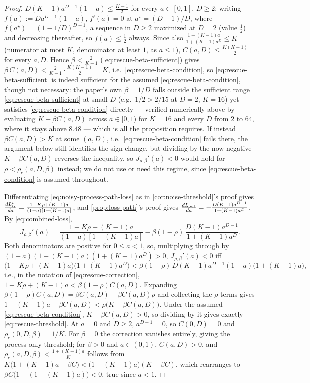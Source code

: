 \begin{proof}
$D(K-1)a^{D-1}(1-a)\le\frac{K-1}2$ for every $a\in[0,1]$, $D\ge2$: writing
$f(a):=Da^{D-1}(1-a)$, $f'(a)=0$ at $a^\star=(D-1)/D$, where
$f(a^\star)=(1-1/D)^{D-1}$, a sequence in $D\ge2$ maximized at $D=2$
(value $\tfrac12$) and decreasing thereafter, so $f(a)\le\tfrac12$
always. Since also $\frac{1+(K-1)a}{1+(K-1)a^D}\le K$ (numerator at most
$K$, denominator at least $1$, as $a\le1$), $C(a,D)\le\frac{K(K-1)}2$ for
every $a,D$. Hence $\beta<\frac2{K-1}$ (\cref{eq:rescue-beta-sufficient})
gives $\beta\,C(a,D)<\frac2{K-1}\cdot\frac{K(K-1)}2=K$, i.e.\
\cref{eq:rescue-beta-condition}, so \cref{eq:rescue-beta-sufficient} is
indeed sufficient for the assumed \cref{eq:rescue-beta-condition}, though
not necessary: the paper's own $\beta=1/D$ falls outside the sufficient
range \cref{eq:rescue-beta-sufficient} at small $D$ (e.g.\ $1/2>2/15$ at
$D=2$, $K=16$) yet satisfies \cref{eq:rescue-beta-condition} directly ---
verified numerically above by evaluating $K-\beta C(a,D)$ across
$a\in[0,1)$ for $K=16$ and every $D$ from $2$ to $64$, where it stays
above $8.48$ --- which is all the proposition requires. If instead
$\beta C(a,D)>K$ at some $(a,D)$, i.e.\ \cref{eq:rescue-beta-condition}
fails there, the argument below still identifies the sign change, but
dividing by the now-negative $K-\beta C(a,D)$ reverses the inequality, so
$J_{\rho,\beta}'(a)<0$ would hold for $\rho<\rho_c(a,D,\beta)$ instead; we
do not use or need this regime, since \cref{eq:rescue-beta-condition} is
assumed throughout.

Differentiating \cref{eq:noisy-process-path-loss} as in
\cref{cor:noise-threshold}'s proof gives
$\frac{dL^\rho_{\rm tr}}{da}=\frac{1-K\rho+(K-1)a}{(1-a)[1+(K-1)a]}$, and
\cref{prop:loss-path}'s proof gives
$\frac{dL_{\rm out}}{da}=-\frac{D(K-1)a^{D-1}}{1+(K-1)a^D}$. By
\cref{eq:combined-loss},
\[
 J_{\rho,\beta}'(a)
 =\frac{1-K\rho+(K-1)a}{(1-a)[1+(K-1)a]}
 -\beta(1-\rho)\,\frac{D(K-1)a^{D-1}}{1+(K-1)a^D}.
\]
Both denominators are positive for $0\le a<1$, so, multiplying through by
$(1-a)(1+(K-1)a)(1+(K-1)a^D)>0$, $J_{\rho,\beta}'(a)<0$ iff
\[
 \bigl(1-K\rho+(K-1)a\bigr)\bigl(1+(K-1)a^D\bigr)
 <\beta(1-\rho)\,D(K-1)a^{D-1}(1-a)\bigl(1+(K-1)a\bigr),
\]
i.e., in the notation of \cref{eq:rescue-correction},
$1-K\rho+(K-1)a<\beta(1-\rho)C(a,D)$. Expanding
$\beta(1-\rho)C(a,D)=\beta C(a,D)-\beta C(a,D)\rho$ and collecting the
$\rho$ terms gives
$1+(K-1)a-\beta C(a,D)<\rho\bigl(K-\beta C(a,D)\bigr)$. Under the assumed
\cref{eq:rescue-beta-condition}, $K-\beta C(a,D)>0$, so dividing by it
gives exactly \cref{eq:rescue-threshold}.
At $a=0$ and $D\ge2$, $a^{D-1}=0$, so $C(0,D)=0$ and
$\rho_c(0,D,\beta)=1/K$. For $\beta=0$ the correction vanishes entirely,
giving the process-only threshold; for $\beta>0$ and $a\in(0,1)$,
$C(a,D)>0$, and $\rho_c(a,D,\beta)<\frac{1+(K-1)a}{K}$ follows from
$K\bigl(1+(K-1)a-\beta C\bigr)<\bigl(1+(K-1)a\bigr)(K-\beta C)$, which
rearranges to $\beta C\bigl(1-(1+(K-1)a)\bigr)<0$, true since $a<1$.
\end{proof}

